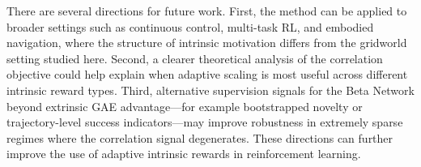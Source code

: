 There are several directions for future work. First, the method can be applied to broader settings such as continuous control, multi-task RL, and embodied navigation, where the structure of intrinsic motivation differs from the gridworld setting studied here. Second, a clearer theoretical analysis of the correlation objective could help explain when adaptive scaling is most useful across different intrinsic reward types. Third, alternative supervision signals for the Beta Network beyond extrinsic GAE advantage---for example bootstrapped novelty or trajectory-level success indicators---may improve robustness in extremely sparse regimes where the correlation signal degenerates. These directions can further improve the use of adaptive intrinsic rewards in reinforcement learning.